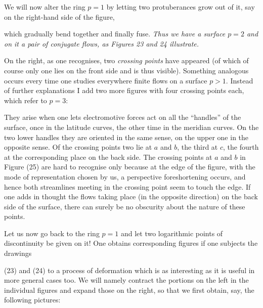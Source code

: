 \documentclass{article}
\begin{document}
We will now alter the ring $p = 1$ by letting two protuberances grow out of it, say on the right-hand side of the figure,

which gradually bend together and finally fuse. \emph{Thus we have a surface $p = 2$ and on it a pair of conjugate flows, as Figures 23 and 24 illustrate.}

On the right, as one recognises, two \emph{crossing points} have appeared (of which of course only one lies on the front side and is thus visible). Something analogous occurs every time one studies everywhere finite flows on a surface $p > 1$. Instead of further explanations I add two more figures with four crossing points each, which refer to $p = 3$:


They arise when one lets electromotive forces act on all the “handles” of the surface, once in the latitude curves, the other time in the meridian curves. On the two lower handles they are oriented in the same sense, on the upper one in the opposite sense. Of the crossing points two lie at $a$ and $b$, the third at $c$, the fourth at the corresponding place on the back side. The crossing points at $a$ and $b$ in Figure (25) are hard to recognise only because at the edge of the figure, with the mode of representation chosen by us, a perspective foreshortening occurs, and hence both streamlines meeting in the crossing point seem to touch the edge. If one adds in thought the flows taking place (in the opposite direction) on the back side of the surface, there can surely be no obscurity about the nature of these points.

Let us now go back to the ring $p = 1$ and let two logarithmic points of discontinuity be given on it! One obtains corresponding figures if one subjects the drawings

(23) and (24) to a process of deformation which is as interesting as it is useful in more general cases too. We will namely contract the portions on the left in the individual figures and expand those on the right, so that we first obtain, say, the following pictures:
\end{document}
